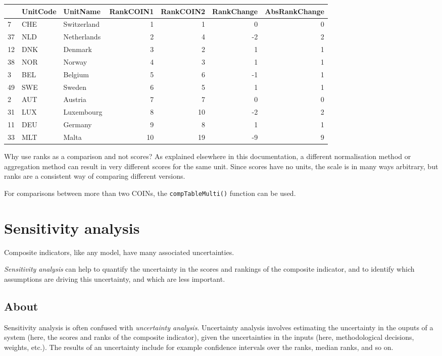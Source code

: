 \documentclass[
]{book}
\begin{document}
\begin{tabular}{l|l|l|r|r|r|r}
\hline
  & UnitCode & UnitName & RankCOIN1 & RankCOIN2 & RankChange & AbsRankChange\\
\hline
7 & CHE & Switzerland & 1 & 1 & 0 & 0\\
\hline
37 & NLD & Netherlands & 2 & 4 & -2 & 2\\
\hline
12 & DNK & Denmark & 3 & 2 & 1 & 1\\
\hline
38 & NOR & Norway & 4 & 3 & 1 & 1\\
\hline
3 & BEL & Belgium & 5 & 6 & -1 & 1\\
\hline
49 & SWE & Sweden & 6 & 5 & 1 & 1\\
\hline
2 & AUT & Austria & 7 & 7 & 0 & 0\\
\hline
31 & LUX & Luxembourg & 8 & 10 & -2 & 2\\
\hline
11 & DEU & Germany & 9 & 8 & 1 & 1\\
\hline
33 & MLT & Malta & 10 & 19 & -9 & 9\\
\hline
\end{tabular}

Why use ranks as a comparison and not scores? As explained elsewhere in this documentation, a different normalisation method or aggregation method can result in very different scores for the same unit. Since scores have no units, the scale is in many ways arbitrary, but ranks are a consistent way of comparing different versions.

For comparisons between more than two COINs, the \texttt{compTableMulti()} function can be used.

\hypertarget{sensitivity-analysis}{%
\chapter{Sensitivity analysis}\label{sensitivity-analysis}}

Composite indicators, like any model, have many associated uncertainties.

\emph{Sensitivity analysis} can help to quantify the uncertainty in the scores and rankings of the composite indicator, and to identify which assumptions are driving this uncertainty, and which are less important.

\hypertarget{about}{%
\section{About}\label{about}}

Sensitivity analysis is often confused with \emph{uncertainty analysis}. Uncertainty analysis involves estimating the uncertainty in the ouputs of a system (here, the scores and ranks of the composite indicator), given the uncertainties in the inputs (here, methodological decisions, weights, etc.). The results of an uncertainty include for example confidence intervals over the ranks, median ranks, and so on.
\end{document}
